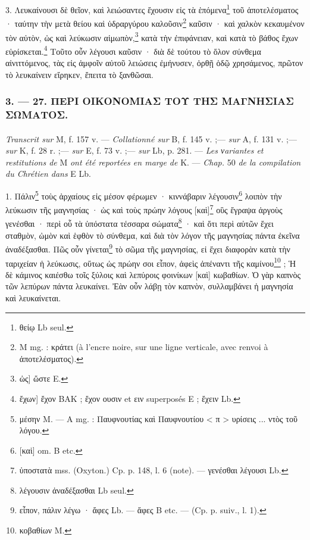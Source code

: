 \documentclass[a4paper, 11pt, oneside, polutonikogreek, french]{article}
\begin{document}
3. Λευκαίνουσι δὲ θεῖον, καὶ λειώσαντες ἔχουσιν εἰς τὰ ἑπόμενα\footnote{θείῳ Lb seul.} τοῦ ἀποτελέσματος · ταύτην τὴν μετὰ θείου καὶ ὑδραργύρου καλοῦσιν\footnote{M mg. : κράτει (à l'encre noire, sur une ligne verticale, avec renvoi à ἀποτελέσματος).} καῦσιν · καὶ χαλκὸν κεκαυμένον τὸν αὐτὸν, ὡς καὶ λεύκωσιν αἱμωπὸν,\footnote{ὡς] ὥστε E.} κατὰ τὴν ἐπιφάνειαν, καὶ κατὰ τὸ βάθος ἔχων εὑρίσκεται.\footnote{ἔχων] ἔχον BAK ; ἔχον ουσιν et ειν superposés E ; ἔχειν Lb.} Τοῦτο οὖν λέγουσι καῦσιν · διὰ δὲ τούτου τὸ ὅλον σύνθεμα αἰνιττόμενος, τὰς εἰς ἀμφοῖν αὐτοῦ λειώσεις ἐμήνυσεν, ὀρθῇ ὁδῷ χρησάμενος, πρῶτον τὸ λευκαίνειν εἴρηκεν, ἔπειτα τὸ ξανθῶσαι.

\bigskip
\centerline{\EightStarTaper}
\centerline{\EightStarTaper\EightStarTaper}
\bigskip

\subsubsection{3. --- 27. ΠΕΡΙ ΟΙΚΟΝΟΜΙΑΣ ΤΟΥ ΤΗΣ ΜΑΓΝΗΣΙΑΣ ΣΩΜΑΤΟΣ.}
\paragraph{}
\emph{Transcrit sur} M, f. 157 v. --- \emph{Collationné sur} B, f. 145 v. ;--- \emph{sur} A, f. 131 v. ;--- \emph{sur} K, f. 28 r. ;--- \emph{sur} E, f. 73 v. ;--- \emph{sur} Lb, p. 281. --- \emph{Les νariantes et restitutions de} M \emph{ont été reportées en marge de} K. --- \emph{Chap.} 50 \emph{de la compilation du Chrétien dans} E Lb.

\bigskip

1. Πάλιν\footnote{μέσην M. --- A mg. : Παυφνουτίας καὶ Παυφνουτίου < π > υρίσεις ... ντὸς τοῦ λόγου.} τοὺς ἀρχαίους εἰς μέσον φέρωμεν · κιννάβαριν λέγουσιν\footnote{[καὶ] om. B etc.} λοιπὸν τὴν λεύκωσιν τῆς μαγνησίας · ὡς καὶ τοὺς πρώην λόγους [καὶ]\footnote{ὑποστατὰ mss. (Oxyton.) Cp. p. 148, l. 6 (note). --- γενέσθαι λέγουσι Lb.} οὓς ἔγραψα ἀργοὺς γενέσθαι · περὶ οὗ τὰ ὑπόστατα τέσσαρα σώματα\footnote{λέγουσιν ἀναδέξασθαι Lb seul.} · καὶ ὅτι περὶ αὐτῶν ἔχει σταθμὸν, ὠμὸν καὶ ἑφθὸν τὸ σύνθεμα, καὶ διὰ τὸν λόγον τῆς μαγνησίας πάντα ἐκεῖνα ἀναδέξασθαι. Πῶς οὖν γίνεται\footnote{εἶπον, πάλιν λέγω · ἄφες Lb. --- ἄφες B etc. --- (Cp. p. suiv., l. 1).} τὸ σῶμα τῆς μαγνησίας, εἰ ἔχει διαφορὰν κατὰ τὴν ταριχείαν ἡ λεύκωσις, οὕτως ὡς πρώην σοι εἶπον, ἀφεὶς ἀπέναντι τῆς καμίνου\footnote{κοβαθίων M.} ; Ἡ δὲ κάμινος καιέσθω τοῖς ξύλοις καὶ λεπύροις φοινίκων [καὶ] κωβαθίων. Ὁ γὰρ καπνὸς τῶν λεπύρων πάντα λευκαίνει. Ἐὰν οὖν λάβῃ τὸν καπνὸν, συλλαμβάνει ἡ μαγνησία καὶ λευκαίνεται.
\end{document}
